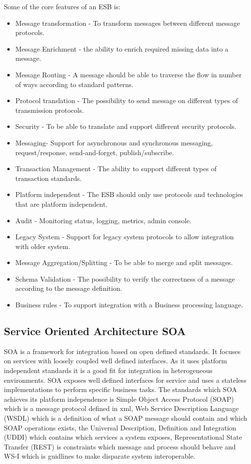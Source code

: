 \documentclass{llncs}
\begin{document}
Some of the core features of an ESB is:
\begin{itemize}
\item Message transformation - To transform messages between different message protocols.
\item Message Enrichment - the ability to enrich required missing data into a message.
\item Message Routing - A message should be able to traverse the flow in number of ways according to standard patterns.
\item Protocol translation - The possibility to send message on different types of transmission protocols.
\item Security - To be able to translate and support different security protocols.
\item Messaging- Support for asynchronous and synchronous messaging, request/response, send-and-forget, publish/subscribe.
\item Transaction Management - The ability to support different types of transaction standards.
\item Platform independent - The ESB should only use protocols and technologies that are platform independent.
\item Audit - Monitoring status, logging, metrics, admin console.
\item Legacy System - Support for legacy system protocols to allow integration with older system.
\item Message Aggregation/Splitting - To be able to merge and split messages.
\item Schema Validation - The possibility to verify the correctness of a message according to the message definition.
\item Business rules - To support integration with a Business processing language.
\end{itemize}



\subsection{Service Oriented Architecture SOA}
SOA is a framework for integration based on open defined standards. It focuses on services with  loosely coupled well defined interfaces. As it uses platform independent standards it is a good fit for integration in heterogeneous environments. SOA exposes well defined interfaces for service and uses a stateless implementations to perform specific business tasks. The standards which SOA achieves its platform independence is Simple Object Access Protocol (SOAP) which is a message protocol defined in xml, Web Service Description Language (WSDL) which is a definition of what a SOAP message should contain and which SOAP operations exists, the Universal Description, Definition and Integration (UDDI) which contains which services a system exposes, Representational State Transfer (REST) is constraints which message and process should behave and WS-I which is guidlines to make disparate system interoperable.
\end{document}
